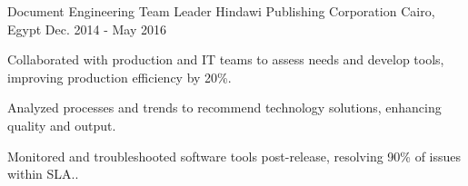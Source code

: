 \begin{cventries}
\cventry
{Document Engineering Team Leader} %
{Hindawi Publishing Corporation} %
{Cairo, Egypt} %
{Dec. 2014 - May 2016} %
{
  \begin{cvitems} %
    \item {Collaborated with production and IT teams to assess needs and develop tools, improving production efficiency by 20\%.}
    \item {Analyzed processes and trends to recommend technology solutions, enhancing quality and output.}
    \item {Monitored and troubleshooted software tools post-release, resolving 90\% of issues within SLA..}
  \end{cvitems}
}


\end{cventries}
